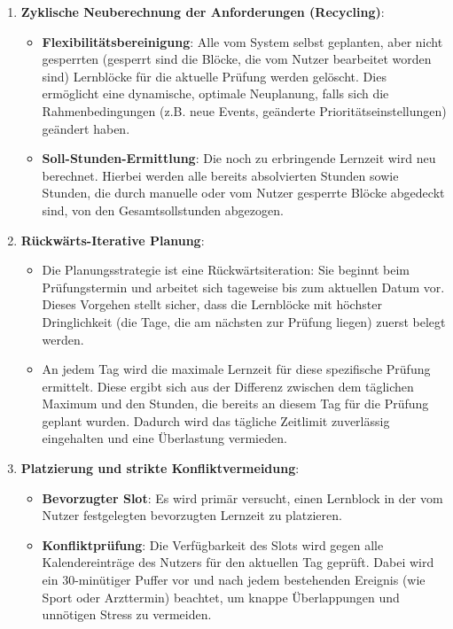 \documentclass[12pt,a4paper]{report}
\begin{document}
\begin{enumerate}
    \item \textbf{Zyklische Neuberechnung der Anforderungen (Recycling)}:
    \begin{itemize}
        \item \textbf{Flexibilitätsbereinigung}: Alle vom System selbst geplanten, aber nicht gesperrten (gesperrt sind die Blöcke, die vom Nutzer bearbeitet worden sind) Lernblöcke für die aktuelle Prüfung werden gelöscht. Dies ermöglicht eine dynamische, optimale Neuplanung, falls sich die Rahmenbedingungen (z.B. neue Events, geänderte Prioritätseinstellungen) geändert haben.
        \item \textbf{Soll-Stunden-Ermittlung}: Die noch zu erbringende Lernzeit wird neu berechnet. Hierbei werden alle bereits absolvierten Stunden sowie Stunden, die durch manuelle oder vom Nutzer gesperrte Blöcke abgedeckt sind, von den Gesamtsollstunden abgezogen.
    \end{itemize}
    \item \textbf{Rückwärts-Iterative Planung}:
    \begin{itemize}
        \item Die Planungsstrategie ist eine Rückwärtsiteration: Sie beginnt beim Prüfungstermin und arbeitet sich tageweise bis zum aktuellen Datum vor. Dieses Vorgehen stellt sicher, dass die Lernblöcke mit höchster Dringlichkeit (die Tage, die am nächsten zur Prüfung liegen) zuerst belegt werden.
        \item An jedem Tag wird die maximale Lernzeit für diese spezifische Prüfung ermittelt. Diese ergibt sich aus der Differenz zwischen dem täglichen Maximum und den Stunden, die bereits an diesem Tag für die Prüfung geplant wurden. Dadurch wird das tägliche Zeitlimit zuverlässig eingehalten und eine Überlastung vermieden.
    \end{itemize}
    \item \textbf{Platzierung und strikte Konfliktvermeidung}:
    \begin{itemize}
        \item \textbf{Bevorzugter Slot}: Es wird primär versucht, einen Lernblock in der vom Nutzer festgelegten bevorzugten Lernzeit zu platzieren.
        \item \textbf{Konfliktprüfung}: Die Verfügbarkeit des Slots wird gegen alle Kalendereinträge des Nutzers für den aktuellen Tag geprüft. Dabei wird ein 30-minütiger Puffer vor und nach jedem bestehenden Ereignis (wie Sport oder Arzttermin) beachtet, um knappe Überlappungen und unnötigen Stress zu vermeiden.

\end{itemize}
\end{enumerate}
\end{document}
